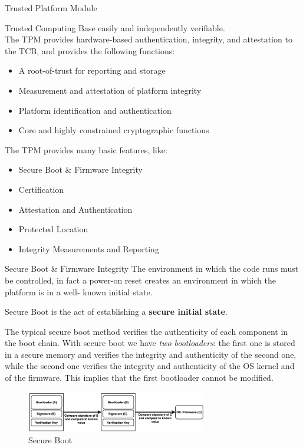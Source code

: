 \begin{section}{Trusted Platform Module}
\begin{subsection}{Trusted Computing Base}
    easily and independently verifiable.\\
    The TPM provides hardware-based authentication, integrity, and attestation to the TCB, and
    provides the following functions:
    \begin{itemize}
      \item A root-of-trust for reporting and storage
      \item Measurement and attestation of platform integrity
      \item Platform identification and authentication
      \item Core and highly constrained cryptographic functions
    \end{itemize}
  \end{subsection}
  The TPM provides many basic features, like:
  \begin{itemize}
    \item Secure Boot & Firmware Integrity
    \item Certification
    \item Attestation and Authentication
    \item Protected Location
    \item Integrity Measurements and Reporting
  \end{itemize}
  \begin{subsection}{Secure Boot \& Firmware Integrity}
    The environment in which the code runs must be controlled, in fact a power-on reset creates an
    environment in which the platform is in a well- known initial state.\\
    \begin{boxH}
      Secure Boot is the act of establishing a \textbf{secure initial state}.
    \end{boxH}
    The typical secure boot method verifies the authenticity of each component in the boot chain.
    With secure boot we have \textit{two bootloaders}: the first one is stored in a secure memory
    and verifies the integrity and authenticity of the second one, while the second one verifies the 
    integrity and authenticity of the OS kernel and of the firmware. This implies that the first
    bootloader cannot be modified.
    \begin{figure}[H]
      \centering
      \includegraphics[width=0.7\textwidth]{img/hardware/secure boot.png}
      \caption{Secure Boot}
    \end{figure}
  \end{subsection}


\end{section}
